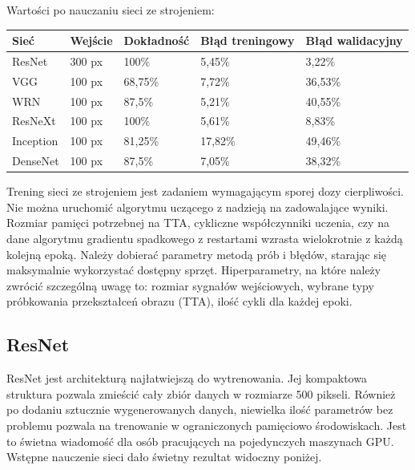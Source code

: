 \documentclass[12pt,a4paper,twoside,titlepage,openright]{book}
\begin{document}
Wartości po nauczaniu sieci ze strojeniem:
\begin{center}
    \begin{tabular}{ | l | l | l | l | l |}
    \hline
    Sieć & Wejście & Dokładność & Błąd treningowy & Błąd walidacyjny \\ \hline
    ResNet & 300 px & 100\% & 5,45\% & 3,22\% \\ \hline
    VGG & 100 px & 68,75\% & 7,72\% & 36,53\% \\ \hline
    WRN & 100 px & 87,5\% & 5,21\% & 40,55\% \\ \hline    
    ResNeXt & 100 px & 100\% & 5,61\% & 8,83\% \\ \hline
    Inception & 100 px & 81,25\% & 17,82\% & 49,46\% \\ \hline
    DenseNet & 100 px & 87,5\% & 7,05\% & 38,32\%\\ \hline
    \end{tabular}
\end{center}

Trening sieci ze strojeniem jest zadaniem wymagającym sporej dozy cierpliwości. Nie można uruchomić algorytmu uczącego z nadzieją na zadowalające wyniki. Rozmiar pamięci potrzebnej na TTA, cykliczne współczynniki uczenia, czy na dane algorytmu gradientu spadkowego z restartami wzrasta wielokrotnie z każdą kolejną epoką. Należy dobierać parametry metodą prób i błędów, starając się maksymalnie wykorzystać dostępny sprzęt. Hiperparametry, na które należy zwrócić szczególną uwagę to: rozmiar sygnałów wejściowych, wybrane typy próbkowania przekształceń obrazu (TTA), ilość cykli dla każdej epoki.

\subsection{ResNet}
ResNet jest architekturą najłatwiejszą do wytrenowania. Jej kompaktowa struktura pozwala zmieścić cały zbiór danych w rozmiarze 500 pikseli. Również po dodaniu sztucznie wygenerowanych danych, niewielka ilość parametrów bez problemu pozwala na trenowanie w ograniczonych pamięciowo środowiskach. Jest to świetna wiadomość dla osób pracujących na pojedynczych maszynach GPU. Wstępne nauczenie sieci dało świetny rezultat widoczny poniżej.
\end{document}
